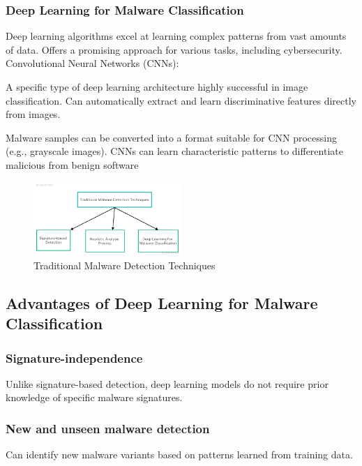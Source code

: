 \documentclass[conference]{IEEEtran}
\begin{document}
\subsubsection{Deep Learning for Malware Classification}
Deep learning algorithms excel at learning complex patterns from vast amounts of data.
Offers a promising approach for various tasks, including cybersecurity.
Convolutional Neural Networks (CNNs):


    A specific type of deep learning architecture highly successful in image classification.
    Can automatically extract and learn discriminative features directly from images.

Malware samples can be converted into a format suitable for CNN processing (e.g., grayscale images).
CNNs can learn characteristic patterns to differentiate malicious from benign software
\begin{figure}[ht] %
  \centering %
  \includegraphics[width=0.5\textwidth]{Untitled.png} %
  \caption{Traditional Malware Detection Techniques } %
  \label{fig:example2} %
\end{figure}



\subsection{Advantages of Deep Learning for Malware Classification}
\subsubsection{Signature-independence} Unlike signature-based detection, deep learning models do not require prior knowledge of specific malware signatures.
\subsubsection{New and unseen malware detection}
Can identify new malware variants based on patterns learned from training data.
\end{document}
